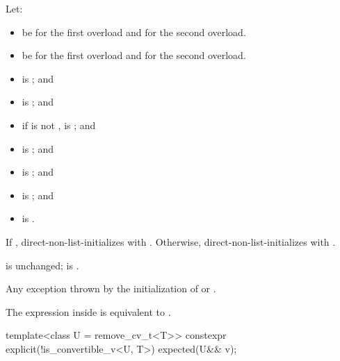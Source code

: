 \begin{itemdescr}
\pnum
Let:
\begin{itemize}
\item
{} be  for the first overload and
 for the second overload.
\item
{} be  for the first overload and
 for the second overload.
\end{itemize}

\pnum
\constraints
\begin{itemize}
\item
{} is ; and
\item
{} is ; and
\item
if  is not \cv{} ,
 is ; and
\item
{} is ; and
\item
{} is ; and
\item
{} is ; and
\item
{} is .
\end{itemize}

\pnum
\effects
If ,
direct-non-list-initializes  with .
Otherwise,
direct-non-list-initializes  with .

\pnum
\ensures
{} is unchanged;
 is .

\pnum
\throws
Any exception thrown by the initialization of  or .

\pnum
\remarks
The expression inside  is equivalent to
.
\end{itemdescr}

%
\begin{itemdecl}
template<class U = remove_cv_t<T>>
  constexpr explicit(!is_convertible_v<U, T>) expected(U&& v);
\end{itemdecl}

